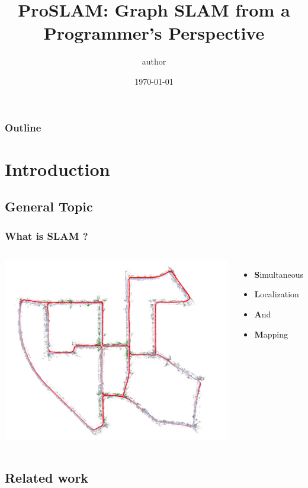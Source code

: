 \documentclass[16pt]{beamer}
\title {ProSLAM: Graph SLAM from a Programmer's Perspective}
\author{author}
\date{\today}
\begin{document}
\frame{\titlepage}

\begin{frame}
  \frametitle{Outline}
  \tableofcontents
\end{frame}

\section{ Introduction }

\subsection*{General Topic}
\begin{frame}
  \frametitle{What is SLAM ? }
  \begin{columns}
    \includegraphics[width=1\textwidth]{slam8}
    \begin{itemize}
    \item \textbf{S}imultaneous
    \item \textbf{L}ocalization
    \item \textbf{A}nd
    \item \textbf{M}apping
    \end{itemize}  
  \end{columns}
\end{frame}

\subsection{Related work}
\end{document}
